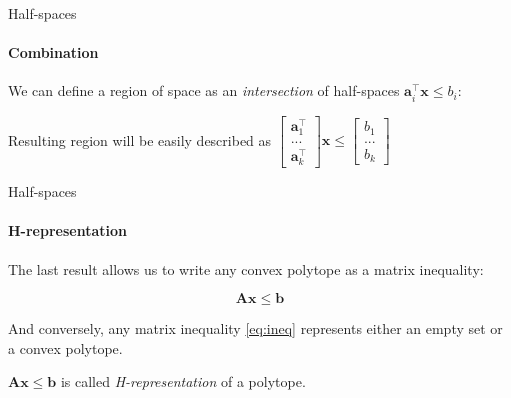 \documentclass{beamer}
\begin{document}
\begin{frame}{Half-spaces}
\framesubtitle{Combination}
\begin{flushleft}

We can define a region of space as an \emph{intersection} of half-spaces $\mathbf{a}_i^\top \mathbf{x} \leq b_i$:



Resulting region will be easily described as $\begin{bmatrix} \mathbf{a}_1^\top \\ ... \\ \mathbf{a}_k^\top \end{bmatrix} \mathbf{x} \leq \begin{bmatrix} b_1 \\ ... \\ b_k \end{bmatrix}$

 
\end{flushleft}
\end{frame}


\begin{frame}{Half-spaces}
\framesubtitle{H-representation}
\begin{flushleft}

The last result allows us to write any convex polytope as a matrix inequality:

\begin{equation}
\label{eq:ineq} 
    \mathbf{A} \mathbf{x} \leq  \mathbf{b} 
\end{equation}

And conversely, any matrix inequality \eqref{eq:ineq} represents either an empty set or a convex polytope.

\bigskip

\begin{definition}
 $\mathbf{A} \mathbf{x} \leq  \mathbf{b}$ is called \emph{H-representation} of a polytope.
\end{definition}
 
\end{flushleft}
\end{frame}
\end{document}
